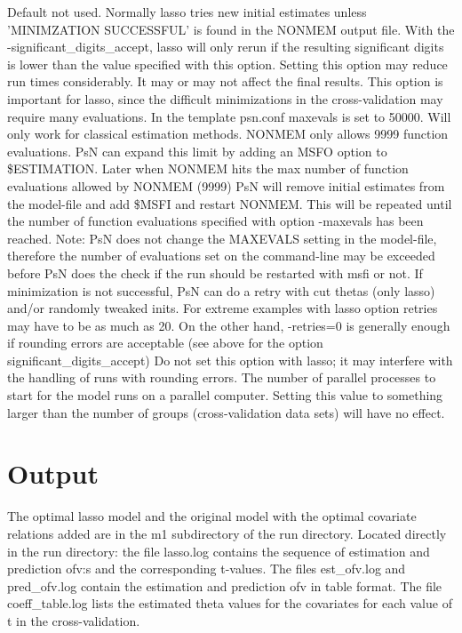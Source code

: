 
\begin{optionlist}
Default not used. Normally lasso tries new initial estimates unless 'MINIMZATION SUCCESSFUL' is found in the NONMEM output file. With the -significant\_digits\_accept, lasso will only rerun if the resulting significant digits is lower than the value specified with this option. Setting this option may reduce run times considerably. It may or may not affect the final results. 
\nextopt
{}
This option is important for lasso, since the difficult minimizations in the cross-validation may require many evaluations. In the template psn.conf maxevals is set to 50000. Will only work for classical estimation methods. NONMEM only allows 9999 function evaluations. PsN can expand this limit by adding an MSFO option to \$ESTIMATION. Later when NONMEM hits the max number of function evaluations allowed by NONMEM (9999) PsN will remove initial estimates from the model-file and add \$MSFI and restart NONMEM. This will be repeated until the number of function evaluations specified with option -maxevals has been reached. Note: PsN does not change the MAXEVALS setting in the model-file, therefore the number of evaluations set on the command-line may be exceeded before PsN does the check if the run should be restarted with msfi or not. 
\nextopt
{}
If minimization is not successful, PsN can do a retry with cut thetas (only lasso) and/or randomly tweaked inits. For extreme examples with lasso option retries may have to be as much as 20. On the other hand, -retries=0 is generally enough if rounding errors are acceptable (see above for the option significant\_digits\_accept) 
\nextopt
{}
Do not set this option with lasso; it may interfere with the handling of runs with rounding errors. 
\nextopt
{}
The number of parallel processes to start for the model runs on a parallel computer. Setting this value to something larger than the number of groups (cross-validation data sets) will have no effect. 
\nextopt
\end{optionlist}

\section{Output}

The optimal lasso model and the original model with the optimal covariate relations added are in the m1 subdirectory of the run directory. Located directly in the run directory: the file lasso.log contains the sequence of estimation and prediction ofv:s and the corresponding t-values. The files est\_ofv.log and pred\_ofv.log contain the estimation and prediction ofv in table format. The file coeff\_table.log lists the estimated theta values for the covariates for each value of t in the cross-validation.

